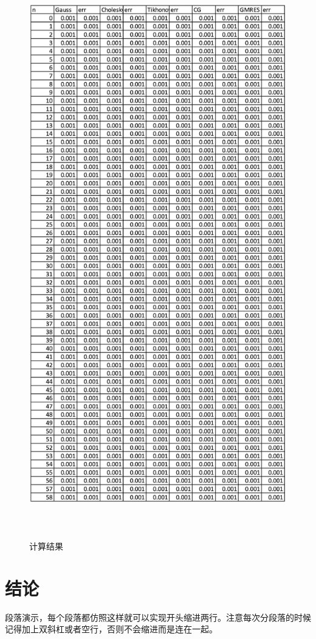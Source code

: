 \documentclass[UTF8,twoside,zihao=-4,AutoFakeBold,scheme=chinese,openany]{ctexart}
\begin{document}
\begin{figure}
\centering %
\includegraphics[width=17cm,height=24.7cm]{gauss.png}
\caption{计算结果}
\label{result}
\end{figure}





\section{结论}
\setlength{\parindent}{2em}段落演示，每个段落都仿照这样就可以实现开头缩进两行。注意每次分段落的时候记得加上双斜杠或者空行，否则不会缩进而是连在一起。
\end{document}

